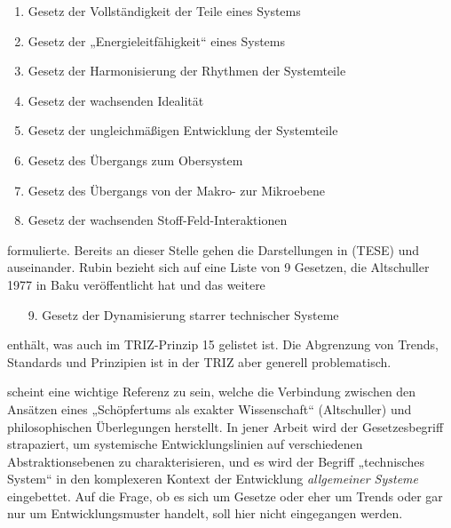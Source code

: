 \documentclass[11pt,a4paper]{article}
\begin{document}
\begin{enumerate}[noitemsep]
\item Gesetz der Vollständigkeit der Teile eines Systems
\item Gesetz der „Energieleitfähigkeit“ eines Systems
\item Gesetz der Harmonisierung der Rhythmen der Systemteile
\item Gesetz der wachsenden Idealität
\item Gesetz der ungleichmäßigen Entwicklung der Systemteile
\item Gesetz des Übergangs zum Obersystem
\item Gesetz des Übergangs von der Makro- zur Mikroebene
\item Gesetz der wachsenden Stoff-Feld-Interaktionen
\end{enumerate}
formulierte. Bereits an dieser Stelle gehen die Darstellungen in (TESE) und
\cite{Rubin2019} auseinander. Rubin bezieht sich auf eine Liste von 9 Gesetzen,
die Altschuller 1977 in Baku veröffentlicht hat und das weitere
\begin{enumerate}[noitemsep]
\item[9.] Gesetz der Dynamisierung starrer technischer Systeme
\end{enumerate}
enthält, was auch im TRIZ-Prinzip 15 gelistet ist. Die Abgrenzung von Trends,
Standards und Prinzipien ist in der TRIZ aber generell problematisch.

\cite{Goldovsky1983} scheint eine wichtige Referenz zu sein, welche die
Verbindung zwischen den Ansätzen eines „Schöpfertums als exakter Wissenschaft“
(Altschuller) und philosophischen Überlegungen herstellt.  In jener Arbeit
wird der Gesetzesbegriff strapaziert, um systemische Entwicklungslinien auf
verschiedenen Abstraktionsebenen zu charakterisieren, und es wird der Begriff
„technisches System“ in den komplexeren Kontext der Entwicklung
\emph{allgemeiner Systeme} eingebettet. Auf die Frage, ob es sich um Gesetze
oder eher um Trends oder gar nur um Entwicklungsmuster handelt, soll hier
nicht eingegangen werden.
\end{document}
